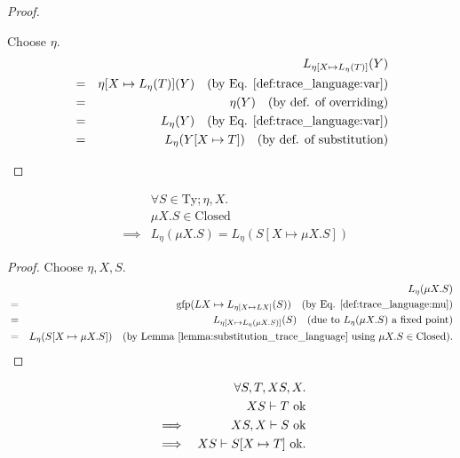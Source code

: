 \documentclass{llncs}
\newcommand*{\Ty}{\mathrm{Ty}}
\newcommand*{\gfp}{\mathrm{gfp}}
\newcommand*{\Closed}{\mathrm{Closed}}
\newcommand*{\ok}[1]{\text{$#1$ {\normalfont \rmfamily ok}}}
\newcommand*{\envimpl}       [2]{#1 \vdash #2}
\newcommand*{\envimplok}     [2]{\envimpl{#1}{\ok{#2}}}
\renewcommand*{\|}{\;|\;}
\begin{document}
\begin{proof}
\begin{enumerate}
      Choose $\eta$.
      \begin{eqnarray*}
        &&  L_{\eta[X \mapsto L_\eta(T)]}(Y) \\
        &=& \eta[X \mapsto L_\eta(T)](Y)
            \quad \text{(by Eq. \ref{def:trace_language:var})} \\
        &=& \eta(Y)
            \quad \text{(by def. of overriding)} \\
        &=& L_\eta(Y)
            \quad \text{(by Eq. \ref{def:trace_language:var})} \\
        &=& L_\eta(Y[X \mapsto T])
            \quad \text{(by def. of substitution)}
      \end{eqnarray*}

  \end{enumerate}
\end{proof}


\begin{lemma}
  \label{lemma:mu_expansion_trace_language}
  \begin{eqnarray*}
    &&         \forall S \in \Ty; \eta, X. \\
    &&         \mu X.S \in \Closed \\ %
    &\implies& L_\eta(\mu X.S) = L_\eta(S[X \mapsto \mu X.S])
  \end{eqnarray*}
\end{lemma}

\begin{proof}
  Choose $\eta, X, S$.
  \begin{eqnarray*}
    &&  L_\eta(\mu X.S) \\
    &=& \gfp(LX \mapsto L_{\eta[X \mapsto LX]}(S))
        \quad \text{(by Eq. \ref{def:trace_language:mu})} \\
    &=& L_{\eta[X \mapsto L_\eta(\mu X.S)]}(S)
        \quad \text{(due to $L_\eta(\mu X.S)$ a fixed point)} \\
    &=& L_\eta(S[X \mapsto \mu X.S])
        \quad \text{(by Lemma \ref{lemma:substitution_trace_language} using $\mu X.S \in \Closed$)}.
  \end{eqnarray*}
\end{proof}


\begin{lemma}
  \label{lemma:substitution_wellformedness}
  \begin{eqnarray*}
    &&         \forall S, T, XS, X. \\
    &&         \envimplok{XS}{T} \\
    &\implies& \envimplok{XS, X}{S} \\
    &\implies& \envimplok{XS}{S[X \mapsto T]}.
  \end{eqnarray*}
\end{lemma}
\end{document}
